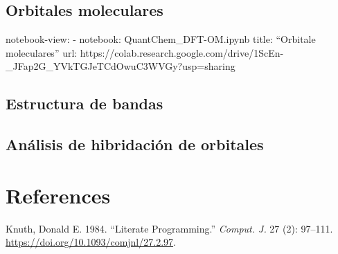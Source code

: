 \documentclass[
  letterpaper,
  DIV=11,
  numbers=noendperiod]{scrreprt}
\newlength{\cslhangindent}
\newlength{\cslentryspacingunit} %
\newenvironment{CSLReferences}[2] %
 {%
  \setlength{\parindent}{0pt}
  \ifodd #1
  \let\oldpar\par
  \def\par{\hangindent=\cslhangindent\oldpar}
  \fi
  \setlength{\parskip}{#2\cslentryspacingunit}
 }%
 {}
\begin{document}
\hypertarget{orbitales-moleculares}{%
\section{Orbitales moleculares}\label{orbitales-moleculares}}

notebook-view: - notebook: QuantChem\_DFT-OM.ipynb title: ``Orbitale
moleculares'' url:
https://colab.research.google.com/drive/1ScEn-\_JFap2G\_YVkTGJeTCdOwuC3WVGy?usp=sharing

\hypertarget{estructura-de-bandas}{%
\section{Estructura de bandas}\label{estructura-de-bandas}}

\hypertarget{anuxe1lisis-de-hibridaciuxf3n-de-orbitales}{%
\section{Análisis de hibridación de
orbitales}\label{anuxe1lisis-de-hibridaciuxf3n-de-orbitales}}


\hypertarget{references}{%
\chapter*{References}\label{references}}

\hypertarget{refs}{}
\begin{CSLReferences}{1}{0}
\leavevmode{}%
Knuth, Donald E. 1984. {``Literate Programming.''} \emph{Comput. J.} 27
(2): 97--111. \url{https://doi.org/10.1093/comjnl/27.2.97}.

\end{CSLReferences}
\end{document}
